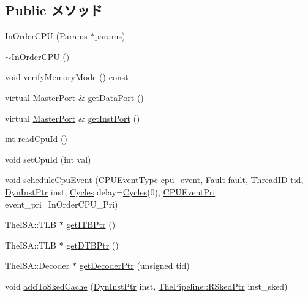 \subsection*{Public メソッド}
\begin{DoxyCompactItemize}
\item 
\hyperlink{classInOrderCPU_abde8e8c7dd0ec0e51d67cc1ae67798d3}{InOrderCPU} (\hyperlink{classInOrderCPU_aa14874985381292db0aea05d1c8a122c}{Params} $\ast$params)
\item 
\hyperlink{classInOrderCPU_a9b26cce2959103d12295be716fe47b10}{$\sim$InOrderCPU} ()
\item 
void \hyperlink{classInOrderCPU_ae2e1ccebe596a180f8105d57f9a93645}{verifyMemoryMode} () const 
\item 
virtual \hyperlink{classMasterPort}{MasterPort} \& \hyperlink{classInOrderCPU_aeea6b55ae1c4be53c21dbee434b221d4}{getDataPort} ()
\item 
virtual \hyperlink{classMasterPort}{MasterPort} \& \hyperlink{classInOrderCPU_a40da530cb5dd380fd7fc0d786e94d5eb}{getInstPort} ()
\item 
int \hyperlink{classInOrderCPU_a65e0754207768ee6d2d6145cb0c5e3a5}{readCpuId} ()
\item 
void \hyperlink{classInOrderCPU_afb191a3765c6e41fbaf116d196312ad8}{setCpuId} (int val)
\item 
void \hyperlink{classInOrderCPU_a7b7130cac388c6a2fd896ba0f6b7b87a}{scheduleCpuEvent} (\hyperlink{classInOrderCPU_aedc081b7a3ef1b1568e62dec4a64c1ca}{CPUEventType} cpu\_\-event, \hyperlink{classRefCountingPtr}{Fault} fault, \hyperlink{base_2types_8hh_ab39b1a4f9dad884694c7a74ed69e6a6b}{ThreadID} tid, \hyperlink{classRefCountingPtr}{DynInstPtr} inst, \hyperlink{classCycles}{Cycles} delay=\hyperlink{classCycles}{Cycles}(0), \hyperlink{classInOrderCPU_a4381feb1878b9c1ea6f5dd3eed8d3197}{CPUEventPri} event\_\-pri=InOrderCPU\_\-Pri)
\item 
TheISA::TLB $\ast$ \hyperlink{classInOrderCPU_aec8d740c4f6e13264bb6bcb0a2f95a5a}{getITBPtr} ()
\item 
TheISA::TLB $\ast$ \hyperlink{classInOrderCPU_a295c8ef68d34e6e430da35d8b4b5bd81}{getDTBPtr} ()
\item 
TheISA::Decoder $\ast$ \hyperlink{classInOrderCPU_a3c58d1da1d6e12bae2927d14cd7289ad}{getDecoderPtr} (unsigned tid)
\item 
void \hyperlink{classInOrderCPU_a51ed27cba133db18c3a632cf6f04a56e}{addToSkedCache} (\hyperlink{classRefCountingPtr}{DynInstPtr} inst, \hyperlink{classResourceSked}{ThePipeline::RSkedPtr} inst\_\-sked)

\end{DoxyCompactItemize}
